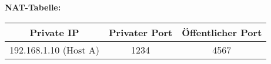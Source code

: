 \begin{enumerate}[a)]
		\bigskip \textbf{NAT-Tabelle:} \\
		\begin{tabular}{c|c|c}
			Private IP            & Privater Port & Öffentlicher Port \\ \hline
			192.168.1.10 (Host A) & 1234          & 4567
		\end{tabular}

%
%

\end{enumerate}




